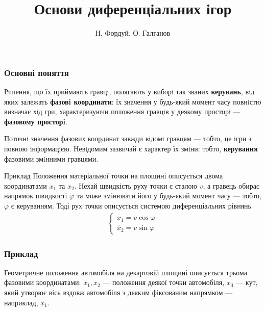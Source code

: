 \documentclass[10pt,pdf]{beamer}
\title{Основи диференціальних ігор}
\author{Н. Фордуй, О. Галганов}
\date{}
\newcommand{\vf}{\varphi}
\renewcommand{\d}[1]{\dot{#1}}
\begin{document}
    \begin{frame}
        \titlepage
    \end{frame}
    \begin{frame}
        \frametitle{Основні поняття}
    
        Рiшення, що їх приймають гравцi, полягають у виборi так званих \textbf{керувань}, вiд яких залежать \textbf{фазовi координати}: 
        їх значення у будь-який момент часу повнiстю визначає хiд гри, характеризуючи положення гравцiв у деякому просторi — \textbf{фазовому просторi}. 

        Поточнi значення фазових координат завжди вiдомi
        гравцям — тобто, це iгри з повною iнформацiєю. Невiдомим зазвичай є
        характер їх змiни: тобто, \textbf{керування} фазовими змiнними гравцями.
        \begin{block}{Приклад}
            Положення матеріальної точки на площині описується двома координатами $x_1$ та $x_2$. 
            Нехай швидкість руху точки є сталою $v$, а гравець обирає напрямок швидкості $\vf$ та може змінювати його у будь-який момент часу --- тобто, $\vf$
            є керуванням. Тоді рух точки описується системою диференціальних рівнянь
            \begin{gather*}
                \begin{cases}
                    \d{x_1} = v \cos \vf \\
                    \d{x_2} = v \sin \vf
                \end{cases}
            \end{gather*}
        \end{block}
    \end{frame}
    \begin{frame}
        \frametitle{Приклад}
    
        Геометричне положення автомобіля на декартовій площині описується трьома фазовими координатами:
        $x_1, x_2$ --- положення деякої точки автомобіля, $x_3$ --- кут, який утворює вісь вздовж автомобіля
        з деяким фіксованим напрямком --- наприклад, $x_1$.
        \begin{center}
        \end{center}
    \end{frame}
\end{document}
